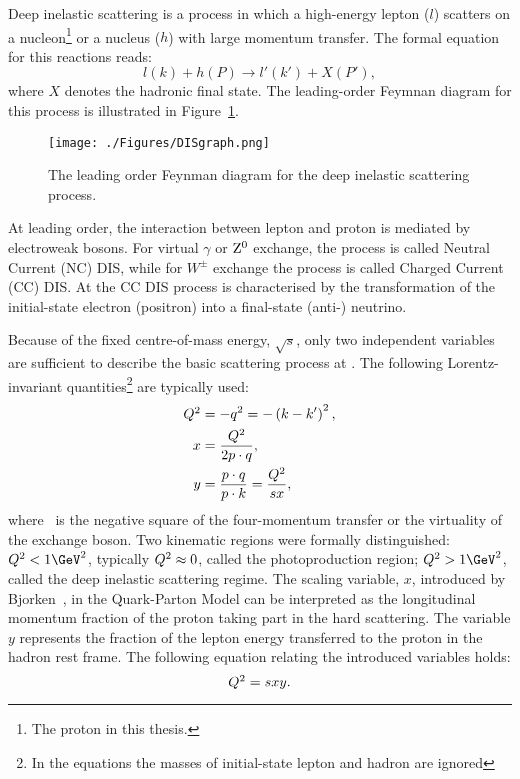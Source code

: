 Deep inelastic scattering is a process in which a high-energy lepton ($l$) scatters on a nucleon\footnote{The proton in this thesis.} or a nucleus ($h$) with large momentum transfer. The formal equation for this reactions reads:
\[
l\left( k \right) + h\left( P \right) \rightarrow l'\left( k' \right) + X\left( P' \right),
\]
where $X$ denotes the hadronic final state. The leading-order Feymnan diagram for this process is illustrated in Figure~\ref{fig:DISgraph}.
\begin{figure}
	\centering
		\texttt{[image: ./Figures/DISgraph.png]}
	\caption{The leading order Feynman diagram for the deep inelastic scattering process.}
	\label{fig:DISgraph}
\end{figure}
At leading order, the interaction between lepton and proton is mediated by electroweak bosons. For virtual $\gamma$ or $\mbox{$\rm{Z}^0$}$ exchange, the process is called Neutral Current (NC) DIS, while for $W^\pm$ exchange the process is called Charged Current (CC) DIS. At \hera the CC DIS process is characterised by the transformation of the initial-state electron (positron) into a final-state (anti-) neutrino.

Because of the fixed centre-of-mass energy, $\sqrt{s}$, only two independent variables are sufficient to describe the basic scattering process at \hera. The following Lorentz-invariant quantities\footnote{In the equations the masses of initial-state lepton and hadron are ignored} are typically used:
\begin{align}
\mbox{${Q^2}$} &= -q^2 = -\left( k - k' \right)^2,\\
     x &= \frac{\mbox{${Q^2}$}}{2p\cdot q},\\
		 y &= \frac{p\cdot q}{p\cdot k} = \frac{\mbox{${Q^2}$}}{sx},
\label{eq:vardefinit}
\end{align}
where \qsq\, is the negative square of the four-momentum transfer or the virtuality of the exchange boson. Two kinematic regions were formally distinguished: $\qsq < 1\GeV^2$, typically $\mbox{${Q^2}$} \approx 0$, called the photoproduction region; $\qsq > 1 \GeV^2$, called the deep inelastic scattering regime. The scaling variable, $x$, introduced by Bjorken~\cite{bjorken}, in the Quark-Parton Model can be interpreted as the longitudinal momentum fraction of the proton taking part in the hard scattering. The variable $y$ represents the fraction of the lepton energy transferred to the proton in the hadron rest frame. The following equation relating the introduced variables holds:
\begin{equation}
\mbox{${Q^2}$} = sxy.
\label{eq:qsxy}
\end{equation}

